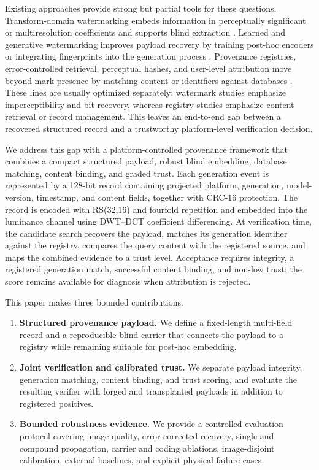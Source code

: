 \documentclass[a4paper,fleqn]{cas-sc}
\begin{document}
Existing approaches provide strong but partial tools for these questions.
Transform-domain watermarking embeds information in perceptually significant
or multiresolution coefficients and supports blind extraction
\cite{cox_secure_1997,benoraira_blind_2015,najafi_robust_2017}. Learned and
generative watermarking improves payload recovery by training post-hoc encoders
or integrating fingerprints into the generation process
\cite{ferrari_hidden_2018,fernandez_stable_2023,xu_invismark_2025,gowal_synthid-image_2025}.
Provenance registries, error-controlled retrieval, perceptual hashes, and
user-level attribution move beyond mark presence by matching content or
identifiers against databases
\cite{saberi_drew_2024,jiang_watermark-based_2026,sharma_distance_2024,mohit_provenance_2026}.
These lines are usually optimized separately: watermark studies emphasize
imperceptibility and bit recovery, whereas registry studies emphasize content
retrieval or record management. This leaves an end-to-end gap between a
recovered structured record and a trustworthy platform-level verification
decision.

We address this gap with a platform-controlled provenance framework that
combines a compact structured payload, robust blind embedding, database
matching, content binding, and graded trust. Each generation event is
represented by a 128-bit record containing projected platform, generation,
model-version, timestamp, and content fields, together with CRC-16 protection.
The record is encoded with RS(32,16) and fourfold repetition and embedded into
the luminance channel using DWT--DCT coefficient differencing. At verification
time, the candidate search recovers the payload, matches its generation
identifier against the registry, compares the query content with the registered
source, and maps the combined evidence to a trust level. Acceptance requires
integrity, a registered generation match, successful content binding, and
non-low trust; the score remains available for diagnosis when attribution is
rejected.

This paper makes three bounded contributions.

\begin{enumerate}
  \item \textbf{Structured provenance payload.} We define a fixed-length
        multi-field record and a reproducible blind carrier that connects the
        payload to a registry while remaining suitable for post-hoc embedding.
  \item \textbf{Joint verification and calibrated trust.} We separate payload
        integrity, generation matching, content binding, and trust scoring, and
        evaluate the resulting verifier with forged and transplanted payloads
        in addition to registered positives.
  \item \textbf{Bounded robustness evidence.} We provide a controlled
        evaluation protocol covering image quality, error-corrected recovery,
        single and compound propagation, carrier and coding ablations,
        image-disjoint calibration, external baselines, and explicit physical
        failure cases.
\end{enumerate}
\end{document}
